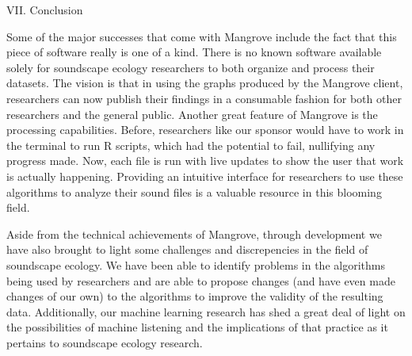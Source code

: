 \begin{center}
VII. Conclusion
\end{center}
\begin{flushleft}
\setlength{\parindent}{0.125in}
Some of the major successes that come with Mangrove include the fact that this piece of software really is one of a kind. There is no known software available solely for soundscape ecology researchers to both organize and process their datasets. The vision is that in using the graphs produced by the Mangrove client, researchers can now publish their findings in a consumable fashion for both other researchers and the general public. Another great feature of Mangrove is the processing capabilities. Before, researchers like our sponsor would have to work in the terminal to run R scripts, which had the potential to fail, nullifying any progress made. Now, each file is run with live updates to show the user that work is actually happening. Providing an intuitive interface for researchers to use these algorithms to analyze their sound files is a valuable resource in this blooming field.\par
Aside from the technical achievements of Mangrove, through development we have also brought to light some challenges and discrepencies in the field of soundscape ecology. We have been able to identify problems in the algorithms being used by researchers and are able to propose changes (and have even made changes of our own) to the algorithms to improve the validity of the resulting data. Additionally, our machine learning research has shed a great deal of light on the possibilities of machine listening and the implications of that practice as it pertains to soundscape ecology research.\par
\end{flushleft}
